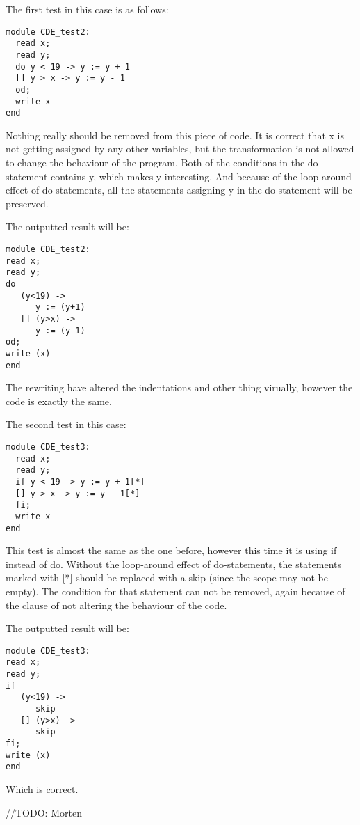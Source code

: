 The first test in this case is as follows:
\begin{lstlisting}
module CDE_test2:
  read x;
  read y;
  do y < 19 -> y := y + 1
  [] y > x -> y := y - 1
  od;
  write x
end
\end{lstlisting}
Nothing really should be removed from this piece of code. It is correct that x is not getting assigned by any other variables, but the transformation is not allowed to change the behaviour of the program. Both of the conditions in the do-statement contains y, which makes y interesting. And because of the loop-around effect of do-statements, all the statements assigning y in the do-statement will be preserved.

The outputted result will be:
\begin{lstlisting}
module CDE_test2:
read x;
read y;
do
   (y<19) ->
      y := (y+1)
   [] (y>x) ->
      y := (y-1)
od;
write (x)
end
\end{lstlisting}
The rewriting have altered the indentations and other thing virually, however the code is exactly the same.

The second test in this case:
\begin{lstlisting}
module CDE_test3:
  read x;
  read y;
  if y < 19 -> y := y + 1[*]
  [] y > x -> y := y - 1[*]
  fi;
  write x
end
\end{lstlisting}
This test is almost the same as the one before, however this time it is using if instead of do. Without the loop-around effect of do-statements, the statements marked with [*] should be replaced with a skip (since the scope may not be empty). The condition for that statement can not be removed, again because of the clause of not altering the behaviour of the code.

The outputted result will be:
\begin{lstlisting}
module CDE_test3:
read x;
read y;
if
   (y<19) ->
      skip
   [] (y>x) ->
      skip
fi;
write (x)
end
\end{lstlisting}
Which is correct.



//TODO: Morten

